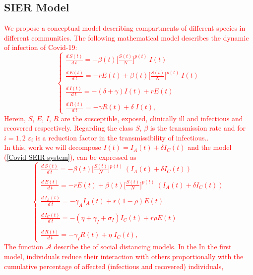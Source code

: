 \documentclass[final,a4paper,reqno]{elsarticle}
\numberwithin{equation}{section}
\newcommand{\eps}{\ensuremath{\varepsilon}}
\begin{document}
\subsection{ SIER Model }
\textcolor{red}{
We propose a conceptual model describing compartments of different species in different communities. The following mathematical model describes the dynamic of infection of Covid-19:
\begin{equation}\label{Covid-SEIR-system}
\begin{cases}
\displaystyle \frac{ d\:S(t)}{d\:t} = -{\beta(t)} \Big[\frac{S(t)}{N}\Big]^{p(t)} \: I(t)\\ \\
\displaystyle  \frac{ d\:E(t)}{d\:t}= -rE(t) +{\beta(t)} \Big[\frac{S(t)}{N}\Big]^{p(t)} \: I(t)\\ \\
\displaystyle  \frac{ d\:I(t)}{d\:t}  = -(\delta +\gamma )I(t)+rE(t)\\ \\
\displaystyle  \frac{ d\:R(t)}{d\:t} = -\gamma R(t)+ \delta\;I(t),
\end{cases}
\end{equation}
Herein, $S$, $E$, $I$, $R$ are the susceptible, exposed, clinically ill and infectious and
recovered respectively. Regarding the class $S$, $\beta$ is the transmission rate and for $i=1,2$ $\eps_i$ is a reduction factor in
the transmissibility of infectious..  \\
In this, work we will decompose $I(t)=I_A(t)+\delta I_C(t)$ and  the model (\ref{Covid-SEIR-system}), can be expressed as 
\begin{equation}\label{Covid-SEIR-system}
\begin{cases}
\displaystyle \frac{ d\:S(t)}{d\:t} = -{\beta(t)} \Big[\frac{S(t)}{N}\Big]^{p(t)} \: (I_A(t)+\delta I_C(t))\\ \\
\displaystyle  \frac{ d\:E(t)}{d\:t}= -rE(t) +{\beta(t)} \Big[\frac{S(t)}{N}\Big]^{p(t)} \: (I_A(t)+\delta I_C(t))\\ \\
\displaystyle  \frac{ d\:I_A(t)}{d\:t}  = -\gamma_A I_A(t)+r(1-\rho)E(t)\\ \\
\displaystyle  \frac{ d\:I_C(t)}{d\:t}  = -(\eta +\gamma_I+\sigma_I )I_C(t)+r\rho E(t)\\ \\
\displaystyle  \frac{ d\:R(t)}{d\:t} = -\gamma_I R(t)+ \eta\;I_C(t),
\end{cases}
\end{equation}
The function  $\mathcal{A}$  describe the  of social distancing models. 
In the 
In the first
model, individuals reduce their interaction with others proportionally
with the cumulative percentage of affected (infectious and recovered)
individuals,
}
\end{document}
